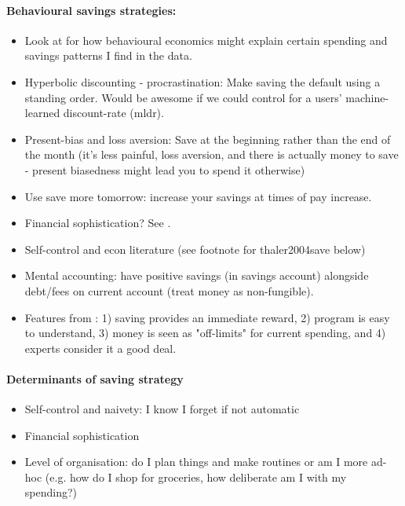 \documentclass[a4paper, 11pt]{report}
\begin{document}
\paragraph{Behavioural savings strategies:}
\begin{itemize}
	\item Look at \citet{thaler1990anomalies} for how behavioural economics might explain certain spending and savings patterns I find in the data.
	\item Hyperbolic discounting - procrastination: Make saving the default using a standing order. Would be awesome if we could control for a users' machine-learned discount-rate (mldr).

	\item Present-bias and loss aversion: Save at the beginning rather than the end of the month (it's less painful, loss aversion, and there is actually money to save - present biasedness might lead you to spend it otherwise)

	\item Use save more tomorrow: increase your savings at times of pay increase.

	\item Financial sophistication? See \citet{jorring2019financial}.

	\item Self-control \citep{biljanovska2018control} and econ literature (see footnote for thaler2004save below)

	\item Mental accounting: have positive savings (in savings account) alongside debt/fees on current account (treat money as non-fungible).

	\item Features from \citet{thaler1994psychology}: 1) saving provides an immediate reward, 2) program is easy to understand, 3) money is seen as "off-limits" for current spending, and 4) experts consider it a good deal.
\end{itemize}

\paragraph{Determinants of saving strategy}
\begin{itemize}
	\item Self-control and naivety: I know I forget if not automatic
	\item Financial sophistication
	\item Level of organisation: do I plan things and make routines or am I more ad-hoc (e.g. how do I shop for groceries, how deliberate am I with my spending?)
\end{itemize}
\end{document}
